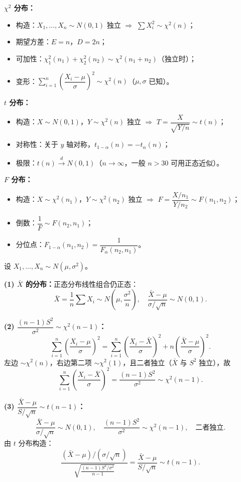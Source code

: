\documentclass[11pt,a4paper]{article}
\begin{document}
\begin{variation}[三大分布的构造与可加性]
\textbf{$\chi^2$ 分布：}
\begin{itemize}[leftmargin=2em]
  \item 构造：$X_1,\dots,X_n\sim N(0,1)$ 独立 $\Rightarrow$ $\sum X_i^2\sim\chi^2(n)$；
  \item 期望方差：$E=n$，$D=2n$；
  \item 可加性：$\chi^2_1(n_1)+\chi^2_2(n_2)\sim\chi^2(n_1+n_2)$（独立时）；
  \item 变形：$\sum_{i=1}^n\!\left(\dfrac{X_i-\mu}{\sigma}\right)^2\sim\chi^2(n)$（$\mu,\sigma$ 已知）。
\end{itemize}

\textbf{$t$ 分布：}
\begin{itemize}[leftmargin=2em]
  \item 构造：$X\sim N(0,1)$，$Y\sim\chi^2(n)$ 独立 $\Rightarrow$ $T=\dfrac{X}{\sqrt{Y/n}}\sim t(n)$；
  \item 对称性：关于 $y$ 轴对称，$t_{1-\alpha}(n)=-t_\alpha(n)$；
  \item 极限：$t(n)\xrightarrow{d}N(0,1)$（$n\to\infty$，一般 $n>30$ 可用正态近似）。
\end{itemize}

\textbf{$F$ 分布：}
\begin{itemize}[leftmargin=2em]
  \item 构造：$X\sim\chi^2(n_1)$，$Y\sim\chi^2(n_2)$ 独立 $\Rightarrow$ $F=\dfrac{X/n_1}{Y/n_2}\sim F(n_1,n_2)$；
  \item 倒数：$\dfrac{1}{F}\sim F(n_2,n_1)$；
  \item 分位点：$F_{1-\alpha}(n_1,n_2)=\dfrac{1}{F_\alpha(n_2,n_1)}$。
\end{itemize}
\end{variation}

\begin{derivation}[单正态总体抽样分布的推导]
设 $X_1,\dots,X_n\sim N(\mu,\sigma^2)$。

\textbf{(1) $\bar X$ 的分布：}正态分布线性组合仍正态：
\[
\bar X=\frac{1}{n}\sum X_i \sim N\!\left(\mu, \frac{\sigma^2}{n}\right), \quad \frac{\bar X-\mu}{\sigma/\sqrt n}\sim N(0,1).
\]

\textbf{(2) $\dfrac{(n-1)S^2}{\sigma^2}\sim\chi^2(n-1)$：}
\[
\sum_{i=1}^n\!\left(\frac{X_i-\mu}{\sigma}\right)^2 = \sum_{i=1}^n\!\left(\frac{X_i-\bar X}{\sigma}\right)^2 + n\!\left(\frac{\bar X-\mu}{\sigma}\right)^2.
\]
左边 $\sim\chi^2(n)$，右边第二项 $\sim\chi^2(1)$，且二者独立（$\bar X$ 与 $S^2$ 独立），故
\[
\sum_{i=1}^n\!\left(\frac{X_i-\bar X}{\sigma}\right)^2 = \frac{(n-1)S^2}{\sigma^2} \sim \chi^2(n-1).
\]

\textbf{(3) $\dfrac{\bar X-\mu}{S/\sqrt n}\sim t(n-1)$：}
\[
\frac{\bar X-\mu}{\sigma/\sqrt n}\sim N(0,1), \quad \frac{(n-1)S^2}{\sigma^2}\sim\chi^2(n-1), \quad \text{二者独立}.
\]
由 $t$ 分布构造：
\[
\frac{(\bar X-\mu)/(\sigma/\sqrt n)}{\sqrt{\frac{(n-1)S^2/\sigma^2}{n-1}}} = \frac{\bar X-\mu}{S/\sqrt n} \sim t(n-1).
\]
\end{derivation}
\end{document}
